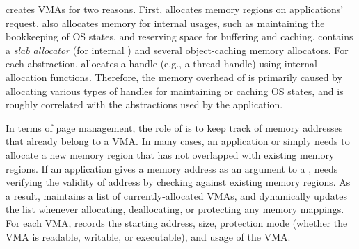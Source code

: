 


\thelibos{} creates VMAs for two reasons.
First, \thelibos{} allocates memory regions on applications' request.
\thelibos{} also allocates memory for internal usages,
such as maintaining
the bookkeeping of OS states,
and reserving space for buffering and caching.
\thelibos{} contains a {\em slab allocator} (for internal ) and several object-caching memory allocators.
For each abstraction, \thelibos{} allocates a handle (e.g., a thread handle)
using internal allocation functions.
Therefore, the memory overhead of \thelibos{} %
is primarily caused by allocating various types of handles for maintaining or caching OS states,
and is roughly correlated with
the abstractions used by the application. 






In terms of page management,
the role of \thelibos{} is to keep track of memory addresses that already belong to a VMA.
In many cases,
an application or \thelibos{}
simply needs to allocate a new memory region that has not overlapped
with existing memory regions.
If an application gives a memory address
as an argument to a \linuxapi{},
\thelibos{} needs verifying the validity of address by checking against existing memory regions. 
As a result,
\thelibos{} maintains a list of currently-allocated VMAs,
and dynamically updates the list whenever allocating, deallocating, or protecting any memory mappings.
For each VMA, \thelibos{} records
the starting address, size, protection mode (whether the VMA is readable, writable, or executable), and usage of the VMA.




